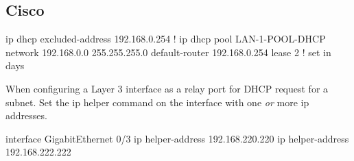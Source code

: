 \subsection{Cisco}

\begin{txt}
    ip dhcp excluded-address 192.168.0.254
    !
    ip dhcp pool LAN-1-POOL-DHCP
    network 192.168.0.0 255.255.255.0
    default-router 192.168.0.254
    lease 2 ! set in days
\end{txt}

When configuring a Layer 3 interface as a relay port for DHCP request for a subnet. Set the ip helper command on the interface with one \textit{or} more ip addresses.

\begin{txt}
    interface GigabitEthernet 0/3
    ip helper-address 192.168.220.220
    ip helper-address 192.168.222.222
\end{txt}
